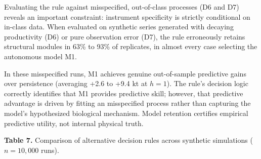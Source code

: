 \documentclass[11pt]{article}
\begin{document}
Evaluating the rule against misspecified, out-of-class processes (D6 and
D7) reveals an important constraint: instrument specificity is strictly
conditional on in-class data. When evaluated on synthetic series
generated with decaying productivity (D6) or pure observation error
(D7), the rule erroneously retains structural modules in 63\% to 93\% of
replicates, in almost every case selecting the autonomous model M1.

In these misspecified runs, M1 achieves genuine out-of-sample predictive
gains over persistence (averaging +2.6 to +9.4 kt at \(h = 1\)). The
rule's decision logic correctly identifies that M1 provides predictive
skill; however, that predictive advantage is driven by fitting an
misspecified process rather than capturing the model's hypothesized
biological mechanism. Model retention certifies empirical predictive
utility, not internal physical truth.

\textbf{Table 7.} Comparison of alternative decision rules across
synthetic simulations (\(n = 10,000\) runs).
\end{document}

